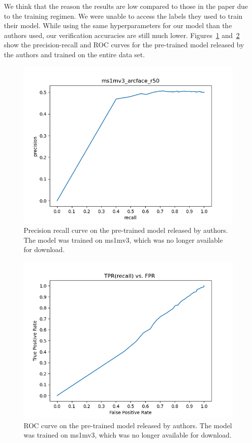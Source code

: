 \documentclass[conference]{IEEEtran}
\begin{document}
We think that the reason the results are low compared to those in the paper due to the training regimen.
We were unable to access the labels they used to train their model.
While using the same hyperparameters for our model than the authors used, our verification accuracies
are still much lower.
Figures~\ref{fig:pre_trained_pr} and~\ref{fig:pre_trained_roc} show the precision-recall and ROC curves 
for the pre-trained model released by the authors and trained on the entire data set.


\begin{figure}
	\centering
	\includegraphics[scale=0.4]{ms1mv3_arcface_r50_pr}
	\caption{Precision recall curve on the pre-trained model released by authors. 
	The model was trained on ms1mv3, which was no longer available for download.}
	\label{fig:pre_trained_pr}
\end{figure}
\begin{figure}
	\centering
	\includegraphics[scale=0.4]{ms1mv3_arcface_r50_roc}
	\caption{ROC curve on the pre-trained model released by authors. 
	The model was trained on ms1mv3, which was no longer available for download.}
	\label{fig:pre_trained_roc}
\end{figure}
\end{document}
